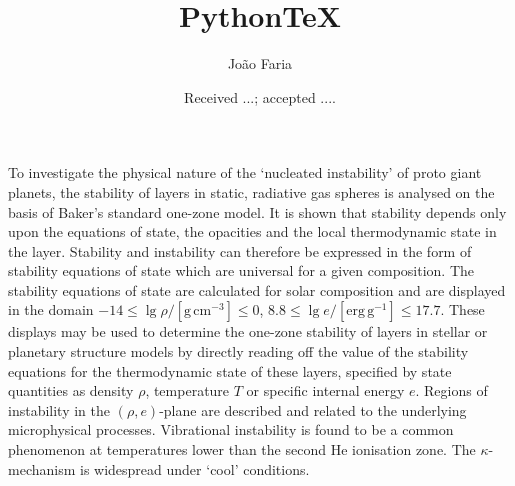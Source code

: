 \documentclass{aa}
\begin{document}
 


   \title{Python\TeX}

   \subtitle{}

   \author{João Faria
          }


   \date{Received ...; accepted ....}

 
  \abstract
   {To investigate the physical nature of the `nuc\-leated instability' of
   proto giant planets, the stability of layers
   in static, radiative gas spheres is analysed on the basis of Baker's
   standard one-zone model.}
   {It is shown that stability
   depends only upon the equations of state, the opacities and the local
   thermodynamic state in the layer. Stability and instability can
   therefore be expressed in the form of stability equations of state
   which are universal for a given composition.}
   {The stability equations of state are
   calculated for solar composition and are displayed in the domain
   $-14 \leq \lg \rho / \mathrm{[g\, cm^{-3}]} \leq 0 $,
   $ 8.8 \leq \lg e / \mathrm{[erg\, g^{-1}]} \leq 17.7$. These displays
   may be
   used to determine the one-zone stability of layers in stellar
   or planetary structure models by directly reading off the value of
   the stability equations for the thermodynamic state of these layers,
   specified
   by state quantities as density $\rho$, temperature $T$ or
   specific internal energy $e$.
   Regions of instability in the $(\rho,e)$-plane are described
   and related to the underlying microphysical processes.}
   {Vibrational instability is found to be a common phenomenon
   at temperatures lower than the second He ionisation
   zone. The $\kappa$-mechanism is widespread under `cool'
   conditions.}
   {}


   \maketitle
%
\end{document}
